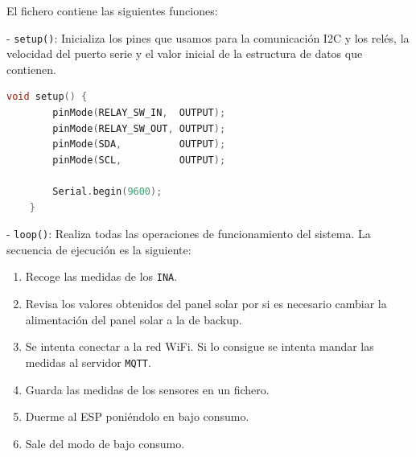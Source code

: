 El fichero contiene las siguientes funciones:

- \texttt{setup()}: Inicializa los pines que usamos para la comunicación I2C y los relés, la velocidad del puerto serie y el valor inicial de la estructura de datos que contienen.

\begin{lstlisting}[captionpos=b, caption={Codigo de la funcion setup}, language=c++]
    void setup() {
        pinMode(RELAY_SW_IN,  OUTPUT);
        pinMode(RELAY_SW_OUT, OUTPUT);
        pinMode(SDA,          OUTPUT);
        pinMode(SCL,          OUTPUT);
    
        Serial.begin(9600);
    }    
\end{lstlisting}

- \texttt{loop()}: Realiza todas las operaciones de funcionamiento del sistema. La secuencia de ejecución es la siguiente:
\begin{enumerate}
    \item Recoge las medidas de los \texttt{INA}.
    \item Revisa los valores obtenidos del panel solar por si es necesario cambiar la alimentación del panel solar a la de backup.
    \item Se intenta conectar a la red WiFi. Si lo consigue se intenta mandar las medidas al servidor \texttt{MQTT}.
    \item Guarda las medidas de los sensores en un fichero.
    \item Duerme al ESP poniéndolo en bajo consumo.
    \item Sale del modo de bajo consumo.
\end{enumerate}

